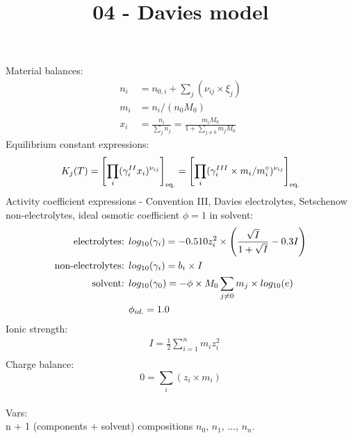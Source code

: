 \documentclass[onecolumn]{article}
\begin{document}
\title{04 - Davies model}
\author{}
\date{}
\maketitle
Material balances:
\begin{equation}
\begin{aligned}
\label{eq:mole_balance}
n_i &= n_{0,i} + \sum_j(\nu_{ij} \times \xi_j) \\
m_i &= n_i /(n_0 M_0) \\
x_i &= \frac{n_i}{\sum_j{n_j}}= \frac{m_i M_0}{1+\sum_{j\neq0}{m_j M_0}}
\end{aligned}
\end{equation}
Equilibrium constant expressions:
\begin{equation}
\label{eq:eq_expr}
K_j(T) = \left[ \prod_i(\gamma^{II}_i x_i)^{\nu_{ij}} \right]_{\textnormal{eq.}} =
\left[ \prod_i(\gamma^{III}_i \times m_i/m^{\circ}_i )^{\nu_{ij}} \right]_{\textnormal{eq.}}
\end{equation}
Activity coefficient expressions - Convention III, Davies electrolytes,
Setschenow non-electrolytes, ideal osmotic coefficient $\phi=1$ in solvent:
\begin{equation}
\label{eq:activity_coeff}
\begin{aligned}
\textnormal{electrolytes: } & log_{10}(\gamma_{i}) = -0.510 z_i^2 \times \left( \frac{\sqrt{I}}{1+\sqrt{I}} -0.3 I \right) \\
\textnormal{non-electrolytes: } & log_{10}(\gamma_{i}) = b_i \times I \\
\textnormal{solvent: } & log_{10}(\gamma_{0}) =
-\phi \times M_0 \sum_{j\neq0}{m_j} \times log_{10}(e)\\
 & \phi_{id.} =   1.0 \\
\end{aligned}
\end{equation}
Ionic strength:
\begin{equation}
\label{eq:ionic_strength}
\begin{aligned}
& I = \frac{1}{2} \sum_{i=1}^n m_i z_i^2 \\
\end{aligned}
\end{equation}
Charge balance:
\begin{equation}
0 = \sum_i(z_i \times m_i)
\end{equation}
\\
Vars: \\
n + 1 (components + solvent) compositions $n_0$, $n_1$, ..., $n_n$. \\
\end{document}
